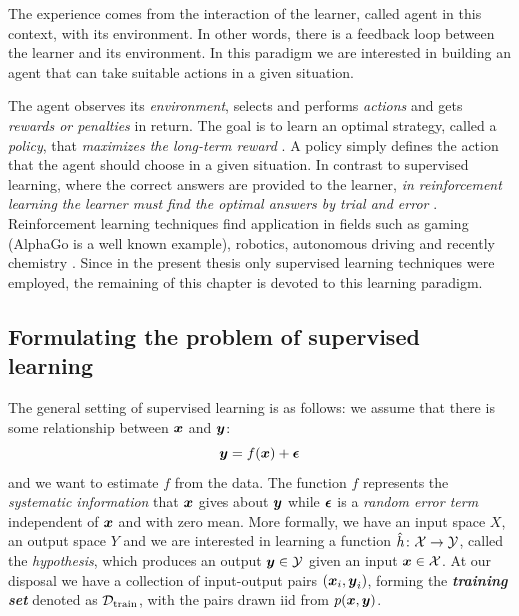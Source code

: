 \begin{definition}
	The experience comes from the interaction of the learner, called
	agent in this context, with its environment. In other words,
	there is a feedback loop between the learner and its environment. In this
	paradigm we are interested in building an agent that can take suitable
	actions in a given situation.
\end{definition}

The agent observes its \emph{environment}, selects and performs \emph{actions}
and gets \emph{rewards or penalties} in return. The goal is to learn an optimal
strategy, called a \emph{policy}, that \emph{maximizes the long-term reward}
\parencite{ml}. A policy simply defines the action that the agent should
choose in a given situation. In contrast to supervised learning, where the
correct answers are provided to the learner, \emph{in reinforcement learning the
learner must find the optimal answers by trial and error}
\parencite{bishop2007}. Reinforcement learning techniques find application in
fields such as gaming (AlphaGo is a well known example), robotics, autonomous
driving and recently chemistry \parencite{li, Gow2022}. Since in the present
thesis only supervised learning techniques were employed, the remaining of this
chapter is devoted to this learning paradigm.

\subsection{Formulating the problem of supervised learning}
\label{subsec:supervised_learning}

The general setting of supervised learning is as follows: we assume that there
is some relationship between $\boldsymbol{x}$ and $\boldsymbol{y}$:
\begin{equation}
	\label{eq:supervised}
	\boldsymbol{y} = f(\boldsymbol{x}) + \boldsymbol{\epsilon}
\end{equation}
and we want to estimate $f$ from the data. The function $f$ represents the
\emph{systematic information} that $\boldsymbol{x}$ gives about $\boldsymbol{y}$ while
$\boldsymbol{\epsilon}$ is a \emph{random error term}
independent of $\boldsymbol{x}$ and with zero mean. More formally, we have an input space
$X$, an output space $Y$ and we are interested in learning a function $\hat{h}
\colon \mathcal{X} \to \mathcal{Y}$, called the \emph{hypothesis},
which produces an output $\boldsymbol{y} \in \mathcal{Y}$ given an input $\boldsymbol{x} \in \mathcal{X}$.
At our disposal we have a collection of input-output pairs $(\boldsymbol{x}_i, \boldsymbol{y}_i)$,
forming the \emph{\textbf{training set}} denoted as
$\mathcal{D}_\text{train}$, with the pairs drawn \acrshort{iid} from $p(\boldsymbol{x}, \boldsymbol{y})$.

